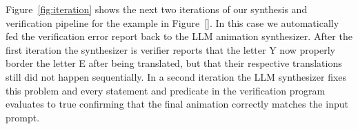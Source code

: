 

Figure~\ref{fig:iteration} shows the next two iterations of our synthesis and
verification pipeline for the example in Figure~\ref{}. In this case
we automatically fed the verification error report back to the LLM
animation synthesizer. After the first iteration the synthesizer is
verifier reports that the letter Y now properly border the letter E after being
translated, but that their respective translations still did not happen
sequentially.
%
In a second iteration the LLM synthesizer fixes this problem and every
statement and predicate in the verification program evaluates to true
confirming that the final animation correctly matches the input
prompt. 
%

